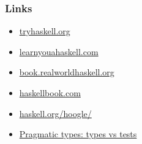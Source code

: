 \documentclass[17pt]{beamer}
\renewcommand{\(}[1]{\begin{columns}[#1]}
\renewcommand{\)}{\end{columns}}
\newcommand{\<}[1]{\begin{column}{#1}}
\renewcommand{\>}{\end{column}}
\begin{document}
\begin{frame}
  \frametitle{Links}
  \begin{itemize}
  \item \href{https://tryhaskell.org}{tryhaskell.org}
  \item \href{https://learnyouahaskell.com}{learnyouahaskell.com}
  \item \href{https://book.realworldhaskell.org}{book.realworldhaskell.org}
  \item \href{http://haskellbook.com}{haskellbook.com}
  \item \href{https://www.haskell.org/hoogle/}{haskell.org/hoogle/}
  \item \href{https://dev.to/stereobooster/pragmatic-types-type-systems-vs-tests-4k3e}{Pragmatic types: types vs tests}
  \end{itemize}
\end{frame}



\end{document}
